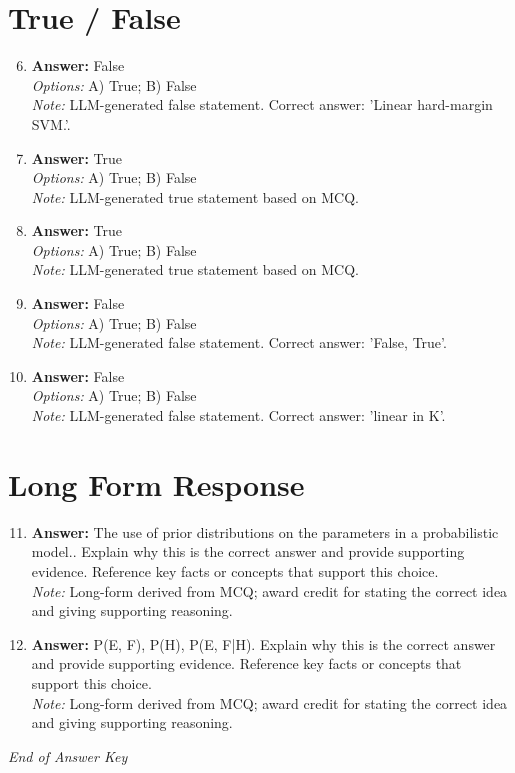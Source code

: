 \documentclass[12pt]{article}
\begin{document}
\section*{True / False}
\begin{enumerate}[label=\arabic*.]
\setcounter{enumi}{5}
\item \textbf{Answer:} False
\\ \textit{Options:} A) True; B) False
\\ \textit{Note:} LLM-generated false statement. Correct answer: 'Linear hard-margin SVM.'.
\item \textbf{Answer:} True
\\ \textit{Options:} A) True; B) False
\\ \textit{Note:} LLM-generated true statement based on MCQ.
\item \textbf{Answer:} True
\\ \textit{Options:} A) True; B) False
\\ \textit{Note:} LLM-generated true statement based on MCQ.
\item \textbf{Answer:} False
\\ \textit{Options:} A) True; B) False
\\ \textit{Note:} LLM-generated false statement. Correct answer: 'False, True'.
\item \textbf{Answer:} False
\\ \textit{Options:} A) True; B) False
\\ \textit{Note:} LLM-generated false statement. Correct answer: 'linear in K'.
\end{enumerate}

\section*{Long Form Response}
\begin{enumerate}[label=\arabic*.]
\setcounter{enumi}{10}
\item \textbf{Answer:} The use of prior distributions on the parameters in a probabilistic model.. Explain why this is the correct answer and provide supporting evidence. Reference key facts or concepts that support this choice.
\\ \textit{Note:} Long-form derived from MCQ; award credit for stating the correct idea and giving supporting reasoning.
\item \textbf{Answer:} P(E, F), P(H), P(E, F|H). Explain why this is the correct answer and provide supporting evidence. Reference key facts or concepts that support this choice.
\\ \textit{Note:} Long-form derived from MCQ; award credit for stating the correct idea and giving supporting reasoning.
\end{enumerate}

\vfill
\noindent\textit{End of Answer Key}
\end{document}
